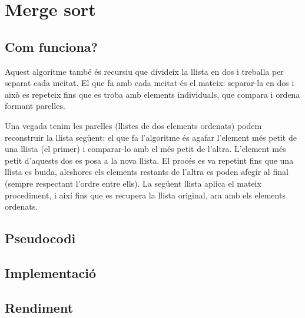 \chapter{Merge sort}

\section{Com funciona?}
Aquest algoritme també és recursiu que divideix la llista en dos i treballa per separat cada meitat. El que fa amb cada meitat és el mateix: separar-la en dos i això es repeteix fins que es troba amb elements individuals, que compara i ordena formant parelles.

Una vegada tenim les parelles (llistes de dos elements ordenats) podem reconstruir la llista següent: el que fa l'algoritme és agafar l'element més petit de una llista (el primer) i comparar-lo amb el més petit de l'altra. L'element més petit d'aquests dos es posa a la nova llista. El procés es va repetint fins que una llista es buida, aleshores els elements restants de l'altra es poden afegir al final (sempre respectant l'ordre entre ells).
La següent llista aplica el mateix procediment, i així fins que es recupera la llista original, ara amb els elements ordenats.
\section{Pseudocodi}
\section{Implementació}

\section{Rendiment}
